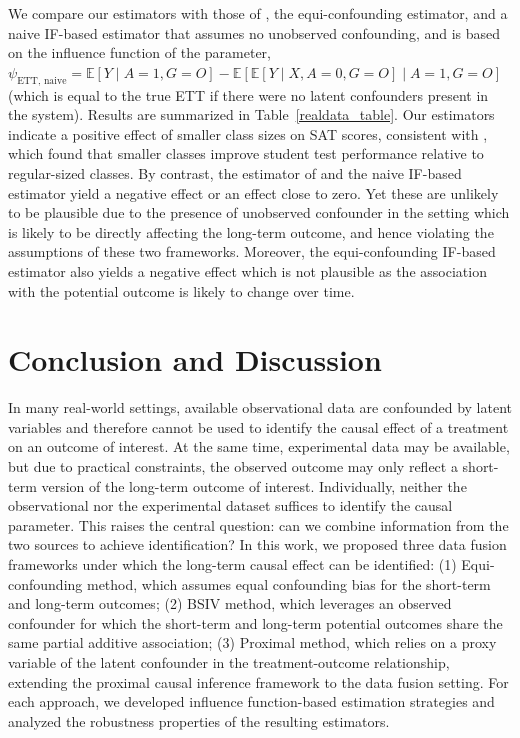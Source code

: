 \documentclass[10pt]{article}
\begin{document}
We compare our estimators with those of \cite{athey2020combining}, the equi-confounding estimator, and a naive IF-based estimator that assumes no unobserved confounding, and is based on the influence function of the parameter, $\psi_{\text{ETT, naive}}=\mathbb{E}[Y\mid A=1,G=O]-\mathbb{E}[\mathbb{E}[Y\mid X,A=0,G=O]\mid A=1,G=O]$ (which is equal to the true ETT if there were no latent confounders present in the system). Results are summarized in Table~\ref{realdata_table}. Our estimators indicate a positive effect of smaller class sizes on SAT scores, consistent with \cite{krueger1999experimental}, which found that smaller classes improve student test performance relative to regular-sized classes. By contrast, the estimator of \cite{athey2020combining} and the naive IF-based estimator yield a negative effect or an effect close to zero. Yet these are unlikely to be plausible due to the presence of unobserved confounder in the setting which is likely to be directly affecting the long-term outcome, and hence violating the assumptions of these two frameworks. Moreover, the equi-confounding IF-based estimator also yields a negative effect which is not plausible as the association with the potential outcome is likely to change over time.








\vspace{-3mm}
\section{Conclusion and Discussion}
\label{sec:conc}

In many real-world settings, available observational data are confounded by latent variables and therefore cannot be used to identify the causal effect of a treatment on an outcome of interest. At the same time, experimental data may be available, but due to practical constraints, the observed outcome may only reflect a short-term version of the long-term outcome of interest. Individually, neither the observational nor the experimental dataset suffices to identify the causal parameter. This raises the central question: can we combine information from the two sources to achieve identification?
In this work, we proposed three data fusion frameworks under which the long-term causal effect can be identified:
(1) Equi-confounding method, which assumes equal confounding bias for the short-term and long-term outcomes;
(2) BSIV method, which leverages an observed confounder for which the short-term and long-term potential outcomes share the same partial additive association;
(3) Proximal method, which relies on a proxy variable of the latent confounder in the treatment-outcome relationship, extending the proximal causal inference framework to the data fusion setting.
For each approach, we developed influence function-based estimation strategies and analyzed the robustness properties of the resulting estimators. 
\end{document}
